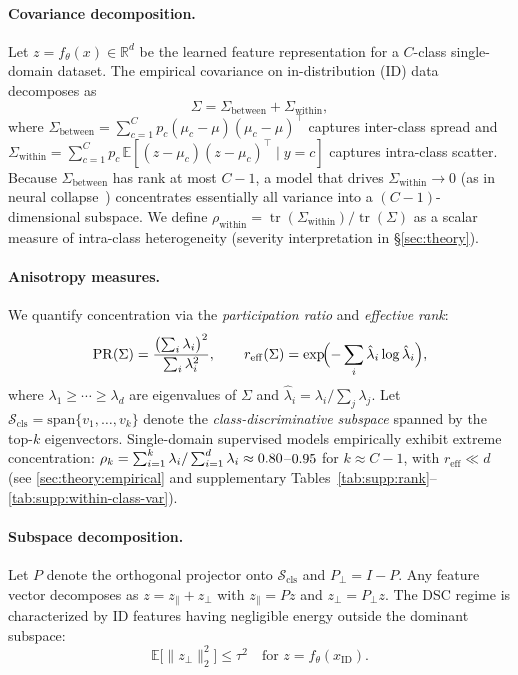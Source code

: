 \documentclass[runningheads]{llncs}
\begin{document}
\paragraph{Covariance decomposition.}
Let $z = f_\theta(x) \in \mathbb{R}^d$ be the learned feature representation for a $C$-class single-domain dataset.
The empirical covariance on in-distribution (ID) data decomposes as
\begin{equation}
  \Sigma = \Sigma_{\mathrm{between}} + \Sigma_{\mathrm{within}},
  \label{eq:cov-decomp}
\end{equation}
where $\Sigma_{\mathrm{between}} = \sum_{c=1}^C p_c (\mu_c - \mu)(\mu_c - \mu)^\top$ captures inter-class spread and $\Sigma_{\mathrm{within}} = \sum_{c=1}^C p_c\,\mathbb{E}[(z-\mu_c)(z-\mu_c)^\top \mid y{=}c]$ captures intra-class scatter.
Because $\Sigma_{\mathrm{between}}$ has rank at most $C{-}1$, a model that drives $\Sigma_{\mathrm{within}} \to 0$ (as in neural collapse~\cite{Papyan2020nc}) concentrates essentially all variance into a $(C{-}1)$-dimensional subspace.
We define $\rho_{\mathrm{within}} = \operatorname{tr}(\Sigma_{\mathrm{within}})/\operatorname{tr}(\Sigma)$ as a scalar measure of intra-class heterogeneity (severity interpretation in \S\ref{sec:theory}).

\paragraph{Anisotropy measures.}
We quantify concentration via the \emph{participation ratio} and \emph{effective rank}:
\begin{equation}
  \mathrm{PR}(\Sigma) = \frac{\bigl(\sum_i \lambda_i\bigr)^2}{\sum_i \lambda_i^2}, \qquad
  r_{\mathrm{eff}}(\Sigma) = \exp\!\Bigl(-\sum_i \hat{\lambda}_i \log \hat{\lambda}_i\Bigr),
  \label{eq:pr-reff}
\end{equation}
where $\lambda_1 \ge \cdots \ge \lambda_d$ are eigenvalues of $\Sigma$ and $\hat{\lambda}_i = \lambda_i / \sum_j \lambda_j$.
Let $\mathcal{S}_{\mathrm{cls}} = \mathrm{span}\{v_1,\ldots,v_k\}$ denote the \emph{class-discriminative subspace} spanned by the top-$k$ eigenvectors.
Single-domain supervised models empirically exhibit extreme concentration: $\rho_k = \sum_{i=1}^{k}\lambda_i / \sum_{i=1}^{d}\lambda_i \approx 0.80$--$0.95$ for $k \approx C{-}1$, with $r_{\mathrm{eff}} \ll d$ (see \cref{sec:theory:empirical} and supplementary Tables~\ref{tab:supp:rank}--\ref{tab:supp:within-class-var}).

\paragraph{Subspace decomposition.}
Let $P$ denote the orthogonal projector onto $\mathcal{S}_{\mathrm{cls}}$ and $P_\perp = I - P$.
Any feature vector decomposes as $z = z_\parallel + z_\perp$ with $z_\parallel = Pz$ and $z_\perp = P_\perp z$.
The DSC regime is characterized by ID features having negligible energy outside the dominant subspace:
\begin{equation}
  \mathbb{E}\bigl[\|z_\perp\|_2^2\bigr] \le \tau^2 \quad \text{for } z = f_\theta(x_{\mathrm{ID}}).
  \label{eq:A1}
\end{equation}
\end{document}
